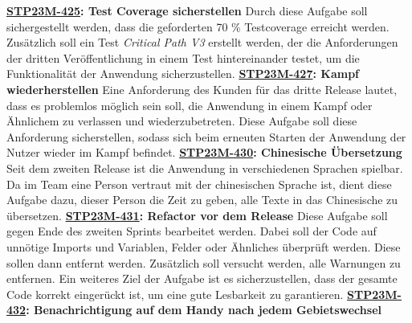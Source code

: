 \textbf{\hyperlink{T425}{\hypertarget{S425}{STP23M-425}}: Test Coverage sicherstellen}
\newline
\newline
Durch diese Aufgabe soll sichergestellt werden, dass die geforderten 70 \% Testcoverage erreicht werden. Zusätzlich soll ein Test \textit{Critical Path V3} erstellt werden, der die Anforderungen der dritten Veröffentlichung in einem Test hintereinander testet, um die Funktionalität der Anwendung sicherzustellen.
\newline
\newline
\textbf{\hyperlink{T427}{\hypertarget{S427}{STP23M-427}}: Kampf wiederherstellen}
\newline
\newline
Eine Anforderung des Kunden für das dritte Release lautet, dass es problemlos möglich sein soll, die Anwendung in einem Kampf oder Ähnlichem zu verlassen und wiederzubetreten. Diese Aufgabe soll diese Anforderung sicherstellen, sodass sich beim erneuten Starten der Anwendung der Nutzer wieder im Kampf befindet.
\newline
\newline
\textbf{\hyperlink{T430}{\hypertarget{S430}{STP23M-430}}: Chinesische Übersetzung}
\newline
\newline
Seit dem zweiten Release ist die Anwendung in verschiedenen Sprachen spielbar. Da im Team eine Person vertraut mit der chinesischen Sprache ist, dient diese Aufgabe dazu, dieser Person die Zeit zu geben, alle Texte in das Chinesische zu übersetzen.
\newline
\newline
\textbf{\hyperlink{T431}{\hypertarget{S431}{STP23M-431}}: Refactor vor dem Release}
\newline
\newline
Diese Aufgabe soll gegen Ende des zweiten Sprints bearbeitet werden. Dabei soll der Code auf unnötige Imports und Variablen, Felder oder Ähnliches überprüft werden. Diese sollen dann entfernt werden. Zusätzlich soll versucht werden, alle Warnungen zu entfernen. Ein weiteres Ziel der Aufgabe ist es sicherzustellen, dass der gesamte Code korrekt eingerückt ist, um eine gute Lesbarkeit zu garantieren.
\newline
\newline
\textbf{\hyperlink{T432}{\hypertarget{S432}{STP23M-432}}: Benachrichtigung auf dem Handy nach jedem Gebietswechsel}
\newline
\newline
